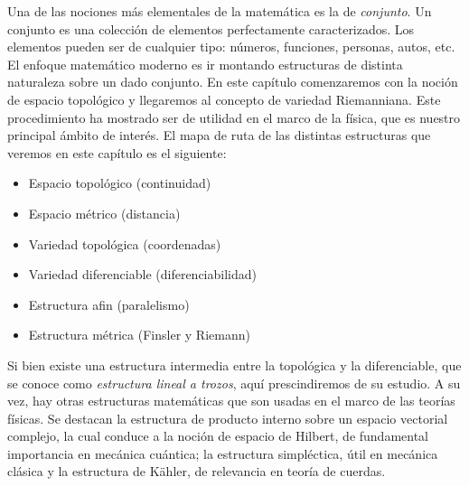 \label{s:WL:Introduccion}

Una  de  las  nociones m\'as  elementales  de  la  matem\'atica  es la  de  {\it
  conjunto}.   Un  conjunto  es   una  colecci\'on  de  elementos  perfectamente
caracterizados.   Los  elementos  pueden   ser  de  cualquier  tipo:  n\'umeros,
funciones, personas, autos, etc. El  enfoque matem\'atico moderno es ir montando
estructuras de  distinta naturaleza sobre  un dado conjunto. En  este cap\'itulo
comenzaremos con la noci\'on de espacio topol\'ogico y llegaremos al concepto de
variedad Riemanniana. Este procedimiento ha mostrado ser de utilidad en el marco
de la f\'isica, que es nuestro principal \'ambito de inter\'es.  El mapa de ruta
de las distintas estructuras que veremos en este cap\'itulo es el siguiente:
%
\begin{itemize}
\item Espacio topol\'ogico (continuidad)
\item Espacio m\'etrico (distancia)
\item Variedad topol\'ogica (coordenadas)
\item Variedad diferenciable (diferenciabilidad)
\item Estructura afin (paralelismo)
\item Estructura m\'etrica (Finsler y Riemann)
\end{itemize}

Si  bien   existe  una  estructura   intermedia  entre  la  topol\'ogica   y  la
diferenciable,  que se  conoce como  {\it  estructura lineal  a trozos},  aqu\'i
prescindiremos de su estudio. A  su vez, hay otras estructuras matem\'aticas que
son usadas en el marco de  las teor\'ias f\'isicas. Se destacan la estructura de
producto  interno sobre  un espacio  vectorial complejo,  la cual  conduce  a la
noci\'on  de  espacio  de  Hilbert,  de fundamental  importancia  en  mec\'anica
cu\'antica;  la estructura simpl\'ectica,  \'util en  mec\'anica cl\'asica  y la
estructura de K\"ahler, de relevancia en teor\'ia de cuerdas.